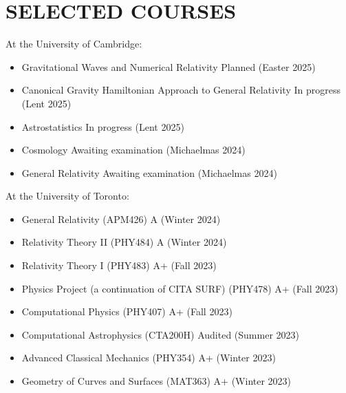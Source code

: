 \documentclass[a4paper,10pt]{extarticle}
\begin{document}
\section*{SELECTED COURSES}
At the University of Cambridge:
\begin{itemize}
    \item Gravitational Waves and Numerical Relativity \hfill Planned (Easter 2025)

    \item Canonical Gravity Hamiltonian Approach to General Relativity \hfill In progress (Lent 2025)

    \item Astrostatistics \hfill In progress (Lent 2025)

    \item Cosmology \hfill Awaiting examination (Michaelmas 2024)

    \item General Relativity \hfill Awaiting examination (Michaelmas 2024)
\end{itemize}

At the University of Toronto:
\begin{itemize}
    \item General Relativity (APM426) \hfill A (Winter 2024)
    
    \item Relativity Theory II (PHY484) \hfill A (Winter 2024)

    \item Relativity Theory I (PHY483) \hfill A+ (Fall 2023)

    \item Physics Project (a continuation of CITA SURF) (PHY478) \hfill A+ (Fall 2023)

    \item Computational Physics (PHY407) \hfill A+ (Fall 2023)

    \item Computational Astrophysics (CTA200H) \hfill Audited (Summer 2023)

    \item Advanced Classical Mechanics (PHY354) \hfill A+ (Winter 2023)

    \item Geometry of Curves and Surfaces (MAT363) \hfill A+ (Winter 2023)
\end{itemize}

\newpage
\end{document}
